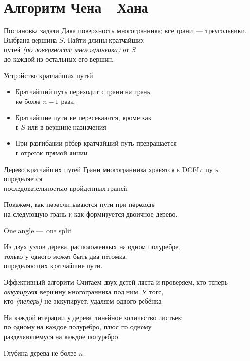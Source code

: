 \section{Алгоритм Чена—Хана}

\begin{frame}{Постановка задачи}
	Дана поверхность многогранника; все грани~— треугольники.\\
	Выбрана вершина \(S\). Найти длины кратчайших \\
	путей {\it (по поверхности многогранника)} от \(S\) \\
	до каждой из остальных его вершин.
\end{frame}


\begin{frame}{Устройство кратчайших путей}
   \begin{itemize}
	\item Кратчайший путь переходит с грани на грань\\
		не более \(n-1\) раза,\medskip
	\item Кратчайшие пути не пересекаются, кроме как\\
		в \(S\) или в вершине назначения,\medskip
	\item При разгибании рёбер кратчайший путь превращается\\
		в отрезок прямой линии.
   \end{itemize}
\end{frame}


\begin{frame}{Дерево кратчайших путей}
	Грани многогранника хранятся в DCEL; путь определяется\\
	последовательностью пройденных граней.

	Покажем, как пересчитываются пути при переходе\\
	на следующую грань и как формируется двоичное дерево.
\end{frame}


\begin{frame}{One angle — one split}
   \begin{lm}
	Из двух узлов дерева, расположенных на одном полуребре,\\
	только у одного может быть два потомка,\\
	определяющих кратчайшие пути.
   \end{lm}
\end{frame}


\begin{frame}{Эффективный алгоритм}
	Считаем двух детей листа и проверяем, кто теперь\\
	{\it оккупирует} вершину многогранника под ним. У того,\\
	кто {\it (теперь)} не оккупирует, удаляем одного ребёнка.

	На каждой итерации у дерева линейное количество листьев:\\
	по одному на каждое полуребро, плюс по одному \\
	разделяющемуся на каждое полуребро.

	Глубина дерева \alert{не более \(n\).}
\end{frame}



